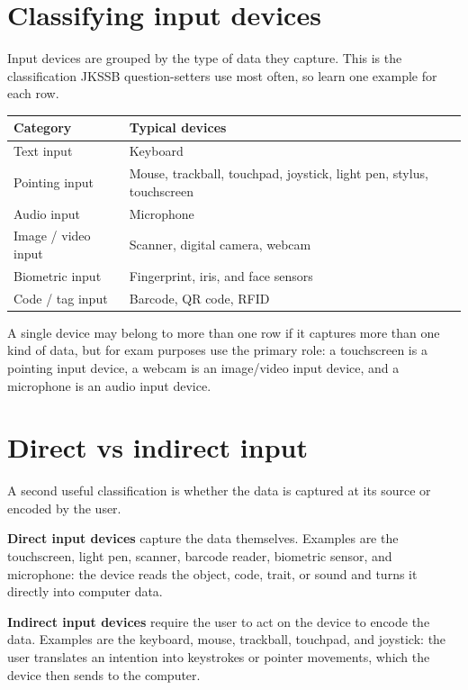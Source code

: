 \documentclass[11pt]{article}
\begin{document}
\section{Classifying input devices}
Input devices are grouped by the type of data they capture. This is the
classification JKSSB question-setters use most often, so learn one example
for each row.

\begin{center}
\begin{tabular}{p{}p{}}
\toprule
\textbf{Category} & \textbf{Typical devices} \\
\midrule
Text input & Keyboard \\
Pointing input & Mouse, trackball, touchpad, joystick, light pen, stylus, touchscreen \\
Audio input & Microphone \\
Image / video input & Scanner, digital camera, webcam \\
Biometric input & Fingerprint, iris, and face sensors \\
Code / tag input & Barcode, QR code, RFID \\
\bottomrule
\end{tabular}
\end{center}

A single device may belong to more than one row if it captures more than one
kind of data, but for exam purposes use the primary role: a touchscreen is a
pointing input device, a webcam is an image/video input device, and a
microphone is an audio input device.

\section{Direct vs indirect input}
A second useful classification is whether the data is captured at its source
or encoded by the user.

\textbf{Direct input devices} capture the data themselves. Examples are the
touchscreen, light pen, scanner, barcode reader, biometric sensor, and
microphone: the device reads the object, code, trait, or sound and turns it
directly into computer data.

\textbf{Indirect input devices} require the user to act on the device to
encode the data. Examples are the keyboard, mouse, trackball, touchpad, and
joystick: the user translates an intention into keystrokes or pointer
movements, which the device then sends to the computer.
\end{document}
